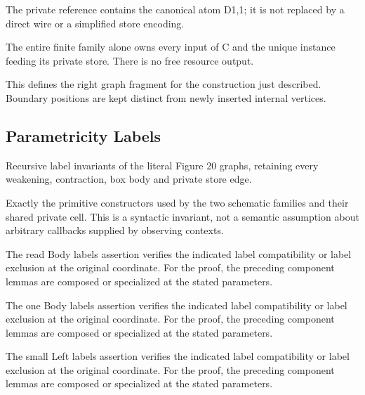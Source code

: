 The private reference contains the canonical atom D1,1; it is not replaced by a direct wire or a simplified store encoding.
\par{}

The entire finite family alone owns every input of C and the unique instance feeding its private store. There is no free resource output.
\par{}

This defines the right graph fragment for the construction just described. Boundary positions are kept distinct from newly inserted internal vertices.
\par{}

\subsection{Parametricity Labels}
Recursive label invariants of the literal Figure 20 graphs, retaining every weakening, contraction, box body and private store edge.

Exactly the primitive constructors used by the two schematic families and their shared private cell. This is a syntactic invariant, not a semantic assumption about arbitrary callbacks supplied by observing contexts.
\par{}

The read Body labels assertion verifies the indicated label compatibility or label exclusion at the original coordinate.
For the proof, the preceding component lemmas are composed or specialized at the stated parameters.
\par{}

The one Body labels assertion verifies the indicated label compatibility or label exclusion at the original coordinate.
For the proof, the preceding component lemmas are composed or specialized at the stated parameters.
\par{}

The small Left labels assertion verifies the indicated label compatibility or label exclusion at the original coordinate.
For the proof, the preceding component lemmas are composed or specialized at the stated parameters.
\par{}

